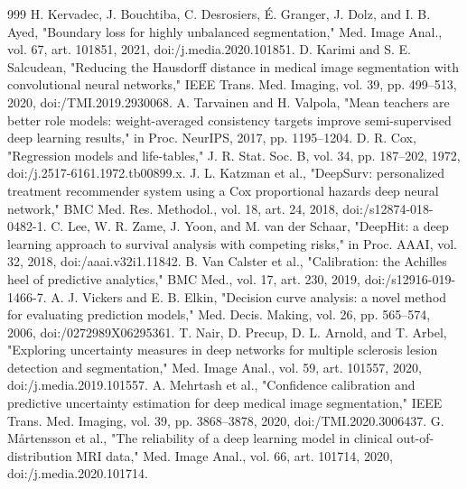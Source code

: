 \documentclass[journal,twoside,web]{ieeecolor}
\begin{document}
\begin{thebibliography}{999}
 H. Kervadec, J. Bouchtiba, C. Desrosiers, É. Granger, J. Dolz, and I. B. Ayed, "Boundary loss for highly unbalanced segmentation," Med. Image Anal., vol. 67, art. 101851, 2021, doi:/\allowbreak j.media.2020.101851.
 D. Karimi and S. E. Salcudean, "Reducing the Hausdorff distance in medical image segmentation with convolutional neural networks," IEEE Trans. Med. Imaging, vol. 39, pp. 499--513, 2020, doi:/\allowbreak TMI.2019.2930068.
 A. Tarvainen and H. Valpola, "Mean teachers are better role models: weight-averaged consistency targets improve semi-supervised deep learning results," in Proc. NeurIPS, 2017, pp. 1195--1204.
 D. R. Cox, "Regression models and life-tables," J. R. Stat. Soc. B, vol. 34, pp. 187--202, 1972, doi:/\allowbreak j.2517-6161.1972.tb00899.x.
 J. L. Katzman et al., "DeepSurv: personalized treatment recommender system using a Cox proportional hazards deep neural network," BMC Med. Res. Methodol., vol. 18, art. 24, 2018, doi:/\allowbreak s12874-018-0482-1.
 C. Lee, W. R. Zame, J. Yoon, and M. van der Schaar, "DeepHit: a deep learning approach to survival analysis with competing risks," in Proc. AAAI, vol. 32, 2018, doi:/\allowbreak aaai.v32i1.11842.
 B. Van Calster et al., "Calibration: the Achilles heel of predictive analytics," BMC Med., vol. 17, art. 230, 2019, doi:/\allowbreak s12916-019-1466-7.
 A. J. Vickers and E. B. Elkin, "Decision curve analysis: a novel method for evaluating prediction models," Med. Decis. Making, vol. 26, pp. 565--574, 2006, doi:/\allowbreak 0272989X06295361.
 T. Nair, D. Precup, D. L. Arnold, and T. Arbel, "Exploring uncertainty measures in deep networks for multiple sclerosis lesion detection and segmentation," Med. Image Anal., vol. 59, art. 101557, 2020, doi:/\allowbreak j.media.2019.101557.
 A. Mehrtash et al., "Confidence calibration and predictive uncertainty estimation for deep medical image segmentation," IEEE Trans. Med. Imaging, vol. 39, pp. 3868--3878, 2020, doi:/\allowbreak TMI.2020.3006437.
 G. Mårtensson et al., "The reliability of a deep learning model in clinical out-of-distribution MRI data," Med. Image Anal., vol. 66, art. 101714, 2020, doi:/\allowbreak j.media.2020.101714.

\end{thebibliography}
\end{document}
